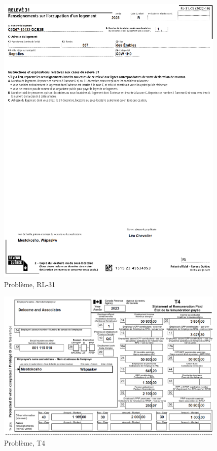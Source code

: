 \begin{figure}
	\centering
	\includegraphics[width=.9\textwidth]{probleme/chapitre-5/Wapaskw-RL31.png}
	\caption[]{Problème, RL-31}
	\label{fig:chap5ProblemeRL31}
\end{figure}
\begin{figure}
	\centering
	\includegraphics[width=.9\textwidth]{probleme/chapitre-5/Wapaskw-T4.png}
	\caption[]{Problème, T4}
	\label{fig:chap5ProblemeT4}
\end{figure}
